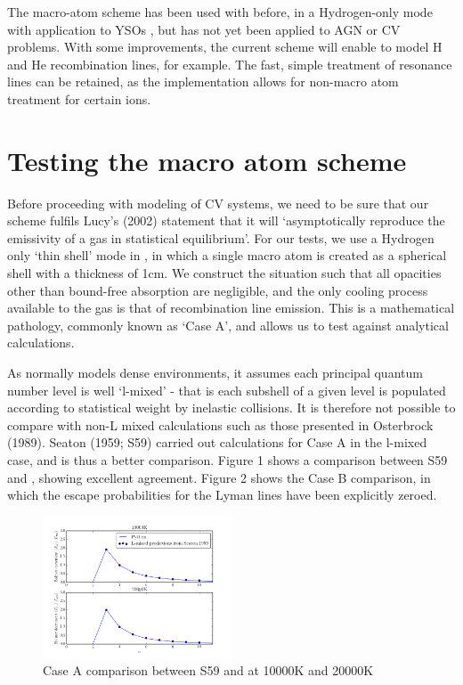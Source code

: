 \documentclass[usenatbib, a4paper]{mn2e}
\begin{document}
The macro-atom scheme has been used with \py before, in a Hydrogen-only mode with application to YSOs \citep{simmacro2005}, but has not yet been applied to AGN or CV problems. With some improvements, the current scheme will enable \py to model H and He recombination lines, for example. The fast, simple treatment of resonance lines 
can be retained, as the \py implementation allows for non-macro atom treatment for certain ions.




%
%

\section{Testing the macro atom scheme}

Before proceeding with modeling of CV systems, we need to be sure that our scheme fulfils Lucy's (2002) 
statement that it will `asymptotically reproduce the emissivity of a gas in statistical equilibrium'.
For our tests, we use a Hydrogen only `thin shell' mode in \py, in which a single macro atom is created as a spherical 
shell with a thickness of 1cm. We construct the situation such that all opacities other than 
bound-free absorption are negligible, and the only cooling process available to the gas is that of
recombination line emission. This is a mathematical pathology, commonly known as `Case A', and allows
us to test against analytical calculations.

As \py normally models dense environments, it assumes each principal quantum number level is
well `l-mixed' - that is each subshell of a given level is populated according to statistical weight by
inelastic collisions. It is therefore not possible to compare with non-L mixed calculations such as 
those presented in Osterbrock (1989\nocite{oster}). Seaton (1959; S59\nocite{seaton}) carried out calculations
for Case A in the l-mixed case, and is thus a better comparison. Figure 1 shows a comparison between S59
and \py, showing excellent agreement. Figure 2 shows the Case B comparison, in which the escape probabilities
for the Lyman lines have been explicitly zeroed.

\begin{figure}
\includegraphics[width=0.5\textwidth]{figures/caseA.png}
\caption{Case A comparison between S59 and \py at 10000K and 20000K}
\end{figure}
\end{document}
